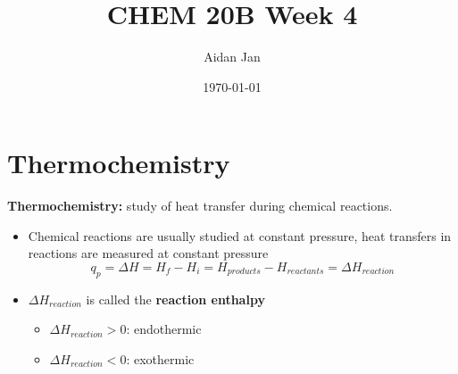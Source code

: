 \documentclass[10pt]{article}
\title{CHEM 20B Week 4}
\author{Aidan Jan}
\date{\today}
\begin{document}
\maketitle
\section*{Thermochemistry}
\textbf{Thermochemistry:} study of heat transfer during chemical reactions.
\begin{itemize}
    \item Chemical reactions are usually studied at constant pressure, heat transfers in reactions are measured at constant pressure
    \[q_p = \Delta H = H_f - H_i = H_{products} - H_{reactants} = \Delta H_{reaction}\]
    \item $\Delta H_{reaction}$ is called the \textbf{reaction enthalpy}
    \begin{itemize}
        \item $\Delta H_{reaction} > 0$: endothermic
        \item $\Delta H_{reaction} < 0$: exothermic
    \end{itemize}
\end{itemize}
\end{document}
